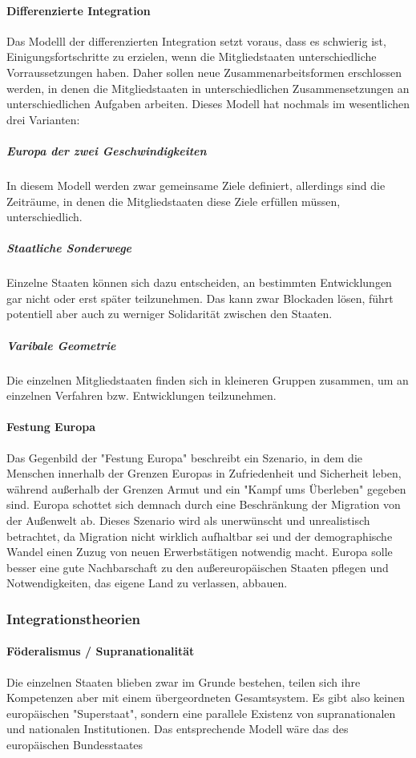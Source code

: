 \documentclass{article}
\begin{document}
	\paragraph{Differenzierte Integration}
	Das Modelll der differenzierten Integration setzt voraus, dass es schwierig ist, Einigungsfortschritte zu erzielen, wenn die Mitgliedstaaten unterschiedliche Vorraussetzungen haben. Daher sollen neue Zusammenarbeitsformen erschlossen werden, in denen die Mitgliedstaaten in unterschiedlichen Zusammensetzungen an unterschiedlichen Aufgaben arbeiten. Dieses Modell hat nochmals im wesentlichen drei Varianten:

	\subparagraph{Europa der zwei Geschwindigkeiten}
	In diesem Modell werden zwar gemeinsame Ziele definiert, allerdings sind die Zeiträume, in denen die Mitgliedstaaten diese Ziele erfüllen müssen, unterschiedlich.

	\subparagraph{Staatliche Sonderwege}
	Einzelne Staaten können sich dazu entscheiden, an bestimmten Entwicklungen gar nicht oder erst später teilzunehmen. Das kann zwar Blockaden lösen, führt potentiell aber auch zu werniger Solidarität zwischen den Staaten.

	\subparagraph{Varibale Geometrie}
	Die einzelnen Mitgliedstaaten finden sich in kleineren Gruppen zusammen, um an einzelnen Verfahren bzw. Entwicklungen teilzunehmen.

	\paragraph{Festung Europa}
	Das Gegenbild der "Festung Europa" beschreibt ein Szenario, in dem die Menschen innerhalb der Grenzen Europas in Zufriedenheit und Sicherheit leben, während außerhalb der Grenzen Armut und ein "Kampf ums Überleben" gegeben sind. Europa schottet sich demnach durch eine Beschränkung der Migration von der Außenwelt ab. Dieses Szenario wird als unerwünscht und unrealistisch betrachtet, da Migration nicht wirklich aufhaltbar sei und der demographische Wandel einen Zuzug von neuen Erwerbstätigen notwendig macht. Europa solle besser eine gute Nachbarschaft zu den außereuropäischen Staaten pflegen und Notwendigkeiten, das eigene Land zu verlassen, abbauen.

	\subsubsection{Integrationstheorien}
	\paragraph{Föderalismus / Supranationalität}
	Die einzelnen Staaten blieben zwar im Grunde bestehen, teilen sich ihre Kompetenzen aber mit einem übergeordneten Gesamtsystem. Es gibt also keinen europäischen "Superstaat", sondern eine parallele Existenz von supranationalen und nationalen Institutionen. Das entsprechende Modell wäre das des europäischen Bundesstaates
\end{document}
